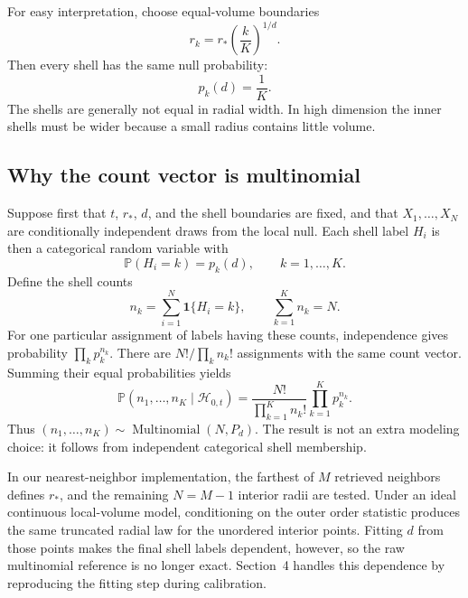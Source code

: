\documentclass[11pt]{article}
\newcommand{\Prb}{\mathbb{P}}
\begin{document}
For easy interpretation, choose equal-volume boundaries
\begin{equation}
  r_k=r_\ast\left(\frac{k}{K}\right)^{1/d}.
  \label{eq:equal-volume-boundaries}
\end{equation}
Then every shell has the same null probability:
\begin{equation}
  p_k(d)=\frac{1}{K}.
  \label{eq:uniform-shell-pmf}
\end{equation}
The shells are generally not equal in radial width. In high dimension the
inner shells must be wider because a small radius contains little volume.

\subsection{Why the count vector is multinomial}

Suppose first that $t$, $r_\ast$, $d$, and the shell boundaries are fixed, and
that $X_1,\ldots,X_N$ are conditionally independent draws from the local null.
Each shell label $H_i$ is then a categorical random variable with
\[
  \Prb(H_i=k)=p_k(d),\qquad k=1,\ldots,K.
\]
Define the shell counts
\begin{equation}
  n_k=\sum_{i=1}^{N}\mathbf 1\{H_i=k\},
  \qquad \sum_{k=1}^{K}n_k=N.
  \label{eq:shell-counts}
\end{equation}
For one particular assignment of labels having these counts, independence
gives probability $\prod_k p_k^{n_k}$. There are
$N!/\prod_k n_k!$ assignments with the same count vector. Summing their equal
probabilities yields
\begin{equation}
  \Prb(n_1,\ldots,n_K\mid\mathcal H_{0,t})
  =\frac{N!}{\prod_{k=1}^{K}n_k!}\prod_{k=1}^{K}p_k^{n_k}.
  \label{eq:multinomial-pmf}
\end{equation}
Thus $(n_1,\ldots,n_K)\sim\operatorname{Multinomial}(N,P_d)$. The result is not
an extra modeling choice: it follows from independent categorical shell
membership.

In our nearest-neighbor implementation, the farthest of $M$ retrieved
neighbors defines $r_\ast$, and the remaining $N=M-1$ interior radii are tested.
Under an ideal continuous local-volume model, conditioning on the outer order
statistic produces the same truncated radial law for the unordered interior
points. Fitting $d$ from those points makes the final shell labels dependent,
however, so the raw multinomial reference is no longer exact. Section~4
handles this dependence by reproducing the fitting step during calibration.
\end{document}
